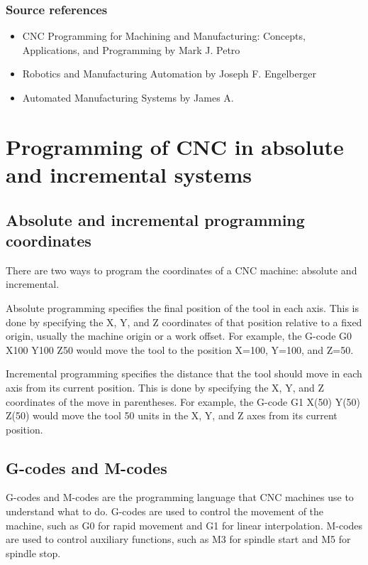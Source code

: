 \documentclass{article}
\begin{document}
\subsubsection*{Source references}
\begin{itemize}
    \item CNC Programming for Machining and Manufacturing: Concepts, Applications, and Programming by Mark J. Petro
    \item Robotics and Manufacturing Automation by Joseph F. Engelberger
    \item Automated Manufacturing Systems by James A.
\end{itemize}

\section*{Programming of CNC in absolute and incremental systems}

\subsection*{Absolute and incremental programming coordinates}
There are two ways to program the coordinates of a CNC machine: absolute and incremental.

Absolute programming specifies the final position of the tool in each axis. This is done by specifying the X, Y, and Z coordinates of that position relative to a fixed origin, usually the machine origin or a work offset. For example, the G-code G0 X100 Y100 Z50 would move the tool to the position X=100, Y=100, and Z=50.

Incremental programming specifies the distance that the tool should move in each axis from its current position. This is done by specifying the X, Y, and Z coordinates of the move in parentheses. For example, the G-code G1 X(50) Y(50) Z(50) would move the tool 50 units in the X, Y, and Z axes from its current position.

\subsection*{G-codes and M-codes}
G-codes and M-codes are the programming language that CNC machines use to understand what to do. G-codes are used to control the movement of the machine, such as G0 for rapid movement and G1 for linear interpolation. M-codes are used to control auxiliary functions, such as M3 for spindle start and M5 for spindle stop.
\end{document}

